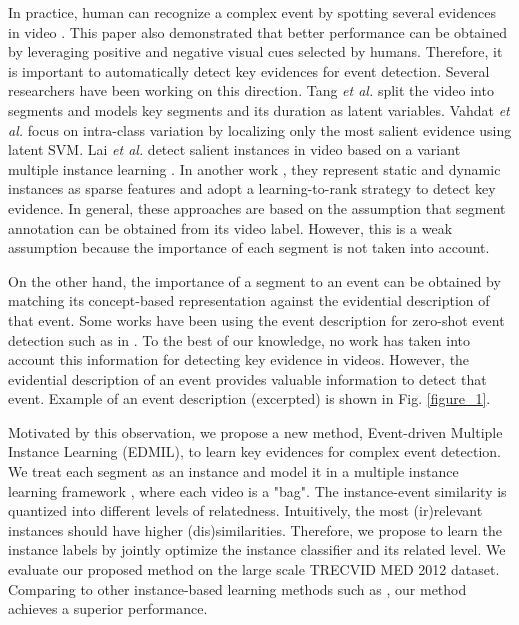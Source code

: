 In practice, human  can recognize a complex event by spotting several evidences in video \cite{bhattacharya2014minimally}. This paper also demonstrated that better performance can be obtained by leveraging positive and negative visual cues selected by humans. Therefore, it is important to automatically detect key evidences for event detection. Several researchers have been working on this direction. Tang \textit{et al.} \cite{tang2012learning} split the video into segments and models key segments and its duration as latent variables. Vahdat \textit{et al.} \cite{vahdat2013compositional} focus on intra-class variation by localizing only the most salient evidence using latent SVM. 
Lai \textit{et al.} \cite{lai2014video} detect salient instances in video based on a variant multiple instance learning . In another work \cite{lai2014recognizing}, they represent static and dynamic instances as sparse features and adopt a learning-to-rank strategy to detect key evidence. In general, these approaches are based on the assumption that segment annotation can be obtained from its video label. However, this is a weak assumption because the importance of each segment is not taken into account. 

On the other hand, the importance of a segment to an event can be obtained by matching its concept-based representation against the evidential description  of that event. Some works have been using the event description for zero-shot event detection such as in \cite{chen2014event,wu2014zero}. To the best of our knowledge, no work has taken into account this information for detecting key evidence in videos. However, the evidential description of an event provides valuable information to detect that event. Example of an event description (excerpted) is shown in Fig. \ref{figure_1}. 

Motivated by this observation, we propose a new method, Event-driven Multiple Instance Learning (EDMIL), to learn key evidences for complex event detection. We treat each segment as an instance and model it in a multiple instance learning framework \cite{andrews2002support}, where each video is a "bag". The instance-event similarity is quantized into different levels of relatedness. Intuitively, the most (ir)relevant instances should have higher (dis)similarities. Therefore, we propose to learn the instance labels by jointly optimize the instance classifier and its related level. We evaluate our proposed method on the large scale TRECVID MED 2012 dataset. Comparing to other instance-based learning methods such as \cite{andrews2002support,lai2014video}, our method achieves a superior performance.

